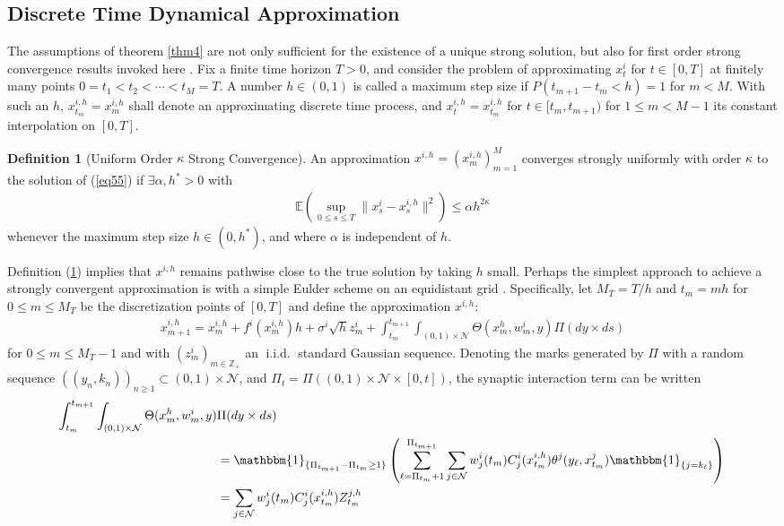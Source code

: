 \documentclass[12pt, oneside]{report}
\newcommand{\E}{\mathbb{E}}
\newcommand{\mbb}[1]{\mathbb{#1}}
\newcommand{\1}[1]{\mathbbm{1}_{\{#1\}}}
\newcommand{\mc}[1]{\mathcal{#1}}
\DeclareMathOperator{\iid}{i.i.d.}
\theoremstyle{definition}
\newtheorem{definition}[theorem]{Definition}
\begin{document}
\subsection{Discrete Time Dynamical Approximation}
The assumptions of theorem \ref{thm4} are not only sufficient for the existence
of a unique strong solution, but also for first order strong convergence results
invoked here \cite{Bruti-Liberati_Nikitopoulos-Sklibosios_Platen_2006}. Fix a
finite time horizon $T>0$, and consider the problem of approximating $x^i_t$ for
$t\in[0,T]$ at finitely many points $0=t_1<t_2<\cdots<t_M=T$. A number
$h\in(0,1)$ is called a maximum step size if $P(t_{m+1}-t_m<h)=1$ for $m<M$.
With such an $h$, $x^{i,h}_{t_m}=x^{i,h}_m$ shall denote an approximating
discrete time process, and $x^{i,h}_t=x^{i,h}_{t_m}$ for $t\in[t_m,t_{m+1})$ for
$1\leq m<M-1$ its constant interpolation on $[0,T]$.
\begin{definition}[Uniform Order $\kappa$ Strong Convergence]\label{def24} An
    approximation $x^{i,h}=(x^{i,h}_m)_{m=1}^M$ converges strongly uniformly
    with order $\kappa$ to the solution of (\ref{eq55}) if $\exists \alpha,
    h^\ast>0$ with
    \begin{align*}
        \E\left(\sup_{0\leq s\leq T}\|x^i_{s}-x^{i,h}_s\|^2\right)\leq \alpha h^{2\kappa}
    \end{align*}
    whenever the maximum step size $h\in(0,h^\ast)$, and where $\alpha$ is
    independent of $h$.
\end{definition}
Definition (\ref{def24}) implies that $x^{i,h}$ remains pathwise close to the
true solution by taking $h$ small. Perhaps the simplest approach to achieve a
strongly convergent approximation is with a simple Eulder scheme on an
equidistant grid
\cite[$\S$3]{Bruti-Liberati_Nikitopoulos-Sklibosios_Platen_2006}. Specifically,
let $M_T=T/h$ and $t_m=mh$ for $0\leq m\leq M_T$ be the discretization points of
$[0,T]$ and define the approximation $x^{i,h}$:
\begin{align}
    x^{i,h}_{m+1}=x^{i,h}_m+f^i(x^{i,h}_m)h+\sigma^i\sqrt{h}z^i_m+\int_{t_m}^{t_{m+1}}\int_{(0,1)\times\mc{N}}\Theta(x^{h}_{m},w^i_m,y)\Pi(dy\times ds)\label{eq56}
\end{align}
for $0\leq m\leq M_T-1$ and with $(z^i_m)_{m\in\mbb{Z}_+}$ an $\iid$ standard
Gaussian sequence. Denoting the marks generated by $\Pi$ with a random sequence
$((y_n,k_n))_{n\geq 1}\subset (0,1)\times\mc{N}$, and
$\Pi_t=\Pi((0,1)\times\mc{N}\times [0,t])$, the synaptic interaction term can be
written
\begin{align}
    \int_{t_m}^{t_{m+1}}\int_{(0,1)\times\mc{N}}\Theta(x^h_m,w^i_m,y)&\Pi(dy\times ds)\notag\\
    &=\1{\Pi_{t_{m+1}}-\Pi_{t_m}\geq 1}\left(\sum_{\ell=\Pi_{t_m}+1}^{\Pi_{t_{m+1}}}\sum_{j\in\mc{N}}w^i_j(t_m)C^i_j(x^{i,h}_{t_m})\theta^j(y_\ell,x^j_{t_m})\1{j=k_\ell}\right)\notag{}\\
    &=\sum_{j\in\mc{N}}w^i_j(t_m)C^i_j(x^{i,h}_{t_m})Z^{j,h}_{t_m}
\end{align}
\end{document}
